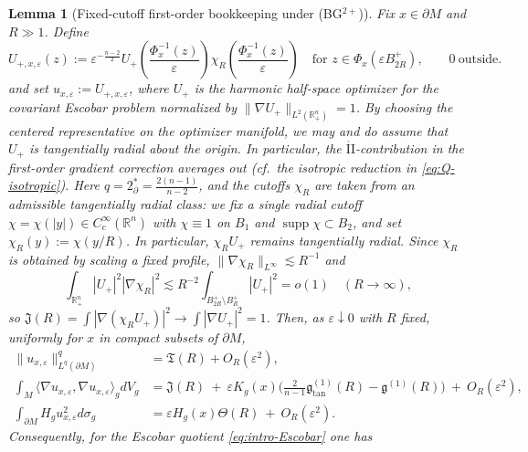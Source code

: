 \documentclass[11pt,reqno,a4paper]{amsart}
\newcommand{\R}{\mathbb{R}}
\numberwithin{equation}{section}
\theoremstyle{plain}
\newtheorem{lemma}[theorem]{Lemma}
\theoremstyle{remark}
\theoremstyle{plain}
\begin{document}
\begin{lemma}[Fixed-cutoff first-order bookkeeping under \textup{(BG$^{2+}$)}]\label{lem:TR1-conf}
Fix $x\in\partial M$ and $R\gg1$. Define
\begin{equation}\label{eq:cov-bubble}
U_{+,x,\varepsilon}(z)
:= \varepsilon^{-\frac{n-2}{2}}
U_{+}\left(\frac{\Phi_x^{-1}(z)}{\varepsilon}\right)\chi_R\left(\frac{\Phi_x^{-1}(z)}{\varepsilon}\right)
\quad\text{for }z\in \Phi_x(\varepsilon B_{2R}^+),\qquad 0\ \text{outside}.
\end{equation}
and set $u_{x,\varepsilon}:=U_{+,x,\varepsilon}$, where $U_+$ is the \emph{harmonic} half-space optimizer
for the covariant Escobar problem normalized by
$\|\nabla U_+\|_{L^2(\R^n_+)}=1$.
By choosing the centered representative on the optimizer manifold, we may and do assume that $U_+$ is \emph{tangentially radial} about the origin. In particular, the $\mathring{\mathrm{II}}$-contribution in the first-order gradient correction averages out (cf.\ the isotropic reduction in \eqref{eq:Q-isotropic}). Here $q=2^*_\partial=\frac{2(n-1)}{n-2}$, and the cutoffs $\chi_R$ are taken from an admissible \emph{tangentially radial} class:
we fix a single radial cutoff $\chi=\chi(|y|)\in C_c^\infty(\R^n)$ with $\chi\equiv1$ on $B_1$ and
$\operatorname{supp}\chi\subset B_2$, and set $\chi_R(y):=\chi(y/R)$. In particular, $\chi_RU_+$ remains
tangentially radial.
 Since $\chi_R$ is obtained by scaling a fixed profile, $\|\nabla\chi_R\|_{L^\infty}\lesssim R^{-1}$ and
\[
\int_{\R^n_+} |U_+|^2|\nabla\chi_R|^2 \lesssim R^{-2}\int_{B_{2R}^+\setminus B_R^+} |U_+|^2 = o(1)\quad(R\to\infty),
\]
so $\mathfrak{J}(R)=\int|\nabla(\chi_R U_+)|^2\to\int|\nabla U_+|^2=1$.
Then, as $\varepsilon\downarrow0$ with $R$ fixed, \emph{uniformly for $x$ in compact subsets of $\partial M$},
\begin{align}
\|u_{x,\varepsilon}\|_{L^{q}(\partial M)}^{q}
&= \mathfrak{T}(R) + O_R(\varepsilon^2),\label{eq:trace-no-linear-conf}\\[1mm]
\int_M \langle \nabla u_{x,\varepsilon},\nabla u_{x,\varepsilon}\rangle_gdV_g
&= \mathfrak{J}(R)\ +\ \varepsilon K_g(x)
\Big(\tfrac{2}{n-1}\mathfrak g^{(1)}_{\mathrm{tan}}(R)-\mathfrak g^{(1)}(R)\Big)
\ +\ O_R(\varepsilon^2),\label{eq:grad-first-order}\\[1mm]
\int_{\partial M} H_gu_{x,\varepsilon}^2d\sigma_g
&= \varepsilon H_g(x)\Theta(R)\ +\ O_R(\varepsilon^2).\label{eq:H-first-order}
\end{align}
Consequently, for the Escobar \emph{quotient} \eqref{eq:intro-Escobar} one has
\begin{equation}\label{eq:E-first-order}

\end{equation}
\end{lemma}
\end{document}
